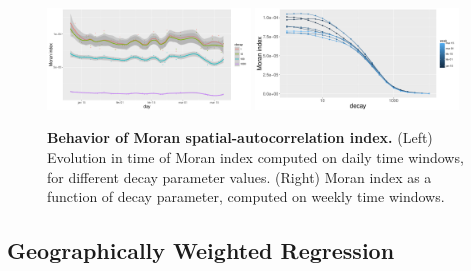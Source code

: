 \documentclass[3p,times,procedia]{elsarticle}
\begin{document}
\begin{figure}
\centering
\includegraphics[width=0.48\textwidth]{figures/moran_days}
\includegraphics[width=0.48\textwidth]{figures/moran_decay_weeks}
\caption{\textbf{Behavior of Moran spatial-autocorrelation index.} (Left) Evolution in time of Moran index computed on daily time windows, for different decay parameter values. (Right) Moran index as a function of decay parameter, computed on weekly time windows.}
\label{fig:moran}
\end{figure}

\subsection{Geographically Weighted Regression}
\end{document}
